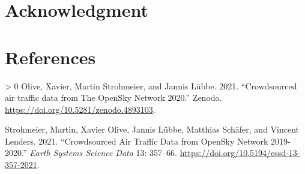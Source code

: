 \documentclass[conference,final,]{IEEEtran}
\newlength{\cslhangindent}
\newenvironment{CSLReferences}[3] %
 {%
  \setlength{\parindent}{0pt}
  \ifodd #1 \everypar{\setlength{\hangindent}{\cslhangindent}}\ignorespaces\fi
  \ifnum #2 > 0
  \setlength{\parskip}{#2\baselineskip}
  \fi
 }%
 {}
\begin{document}
\hypertarget{acknowledgment}{%
\section*{Acknowledgment}\label{acknowledgment}}

\hypertarget{references}{%
\section*{References}\label{references}}

\hypertarget{refs}{}
\begin{CSLReferences}{1}{0}
\leavevmode\hypertarget{ref-xavier_olive_2021_4893103}{}%
Olive, Xavier, Martin Strohmeier, and Jannis Lübbe. 2021. {``{Crowdsourced air traffic data from The OpenSky Network 2020}.''} Zenodo. \url{https://doi.org/10.5281/zenodo.4893103}.

\leavevmode\hypertarget{ref-strohmeier_crowdsourced_2021}{}%
Strohmeier, Martin, Xavier Olive, Jannis Lübbe, Matthias Schäfer, and Vincent Lenders. 2021. {``Crowdsourced Air Traffic Data from {OpenSky Network} 2019-2020.''} \emph{Earth Systems Science Data} 13: 357--66. \url{https://doi.org/10.5194/essd-13-357-2021}.

\end{CSLReferences}
\end{document}
